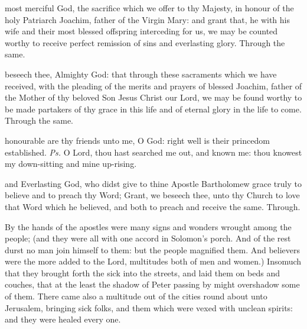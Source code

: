 
\secret
{} most merciful God, the sacrifice which we offer to thy Majesty, in honour of the holy Patriarch Joachim, father of the Virgin Mary: and grant that, he with his wife and their most blessed offspring interceding for us, we may be counted worthy to receive perfect remission of sins and everlasting glory. Through the same.


\postcommunion
{} beseech thee, Almighty God: that through these sacraments which we have received, with the pleading of the merits and prayers of blessed Joachim, father of the Mother of thy beloved Son Jesus Christ our Lord, we may be found worthy to be made partakers of thy grace in this life and of eternal glory in the life to come. Through the same.


\clearpage
{}

\introit
{} honourable are thy friends unto me, O God: right well is their princedom established. \textit{Ps.} O Lord, thou hast searched me out, and known me: thou knowest my down-sitting and mine up-rising.

\collect
{} and Everlasting God, who didst give to thine Apostle Bartholomew grace truly to believe and to preach thy Word; Grant, we beseech thee, unto thy Church to love that Word which he believed, and both to preach and receive the same. Through.

 By the hands of the apostles were many signs and wonders wrought among the people; (and they were all with one accord in Solomon's porch. And of the rest durst no man join himself to them: but the people magnified them. And believers were the more added to the Lord, multitudes both of men and women.) Insomuch that they brought forth the sick into the streets, and laid them on beds and couches, that at the least the shadow of Peter passing by might overshadow some of them. There came also a multitude out of the cities round about unto Jerusalem, bringing sick folks, and them which were vexed with unclean spirits: and they were healed every one.

